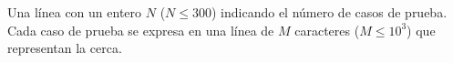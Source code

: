 Una línea con un entero $N$ ($N \leq 300$) indicando el número de casos de prueba.
Cada caso de prueba se expresa en una línea de $M$ caracteres ($M \leq 10^3$) que representan la cerca.
